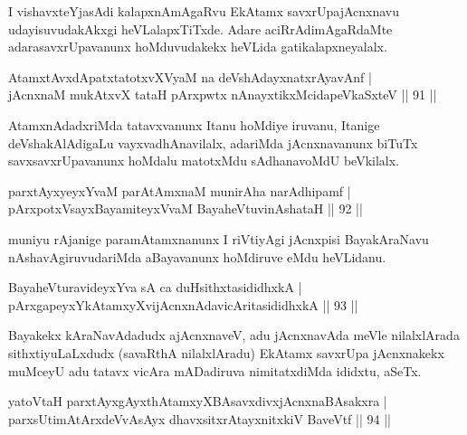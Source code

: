 \begin{artha}
I vishavxteYjasAdi kalapxnAmAgaRvu EkAtamx savxrUpajAcnxnavu udayisuvudakAkxgi heVLalapxTiTxde. Adare aciRrAdimAgaRdaMte adarasavxrUpavanunx hoMduvudakekx heVLida gatikalapxneyalalx.
\end{artha}

\begin{shl}
AtamxtAvxdApatxtatotxvXV\s yaM na deVshAdayxnatxrAyavAnf |\\
jAcnxnaM mukAtxvX tataH pArxpwtx nAnayxtikxMcidapeVkaSxteV \hfill || 91 || 
\end{shl}

\begin{artha}
AtamxnAdadxriMda tatavxvanunx Itanu hoMdiye iruvanu, Itanige deVshakAlAdigaLu vayxvadhAnavilalx, adariMda jAcnxnavanunx biTuTx savxsavxrUpavanunx hoMdalu matotxMdu sAdhanavoMdU beVkilalx.
\end{artha}

\begin{shl}
parxtAyxyeyxYvaM parAtAmxnaM munirAha narAdhipamf |\\
pArxpotxV\s sayxBayamiteyxVvaM BayaheVtuvinAshataH \hfill || 92 || 
\end{shl}

\begin{artha}
muniyu rAjanige paramAtamxnanunx I riVtiyAgi jAcnxpisi BayakAraNavu nAshavAgiruvudariMda aBayavanunx hoMdiruve eMdu heVLidanu.
\end{artha}


\begin{shl}
BayaheVturavideyxYva sA ca duHsithxtasididhxkA |\\
pArxgapeyxYkAtamxyXvijAcnxnAdavicAritasididhxkA \hfill || 93 || 
\end{shl}

\begin{artha}
Bayakekx kAraNavAdadudx ajAcnxnaveV, adu jAcnxnavAda meVle nilalxlArada sithxtiyuLaLxdudx (savaRthA nilalxlAradu) EkAtamx savxrUpa jAcnxnakekx muMceyU adu tatavx vicAra mADadiruva nimitatxdiMda ididxtu, aSeTx.
\end{artha}

\begin{shl}
yatoV\s taH parxtAyxgAyxthAtamxyXBAsavxdivxjAcnxnaBAsakxra |\\
parxsUtimAtArxdeVvAsAyx dhavxsitxrAtayxnitxkiV BaveVtf \hfill || 94 || 
\end{shl}

